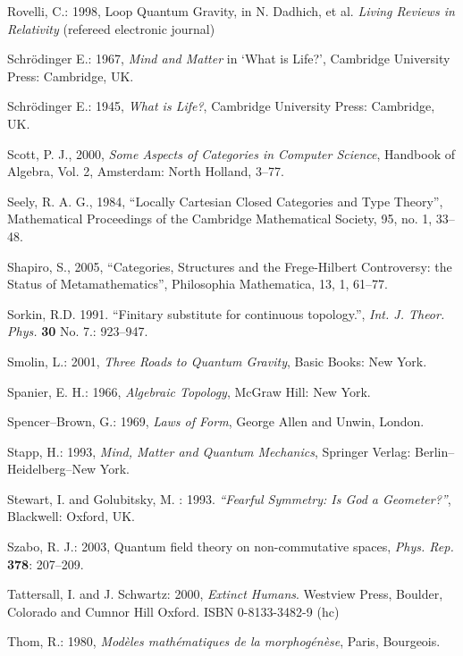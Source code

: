 \documentclass[12pt]{article}
\begin{document}
\begin{thebibliography}{399}
Rovelli, C.: 1998, Loop Quantum Gravity, in N. Dadhich, et al. \emph{Living Reviews in Relativity} (refereed electronic journal) 

Schr\"odinger E.: 1967, \emph{Mind and Matter} in `What is Life?', Cambridge University Press: Cambridge, UK.

Schr\"odinger E.: 1945, \emph{ What is Life?}, Cambridge University Press:
Cambridge, UK.

Scott, P. J., 2000, {\em Some Aspects of Categories in Computer Science}, Handbook of Algebra, Vol. 2, Amsterdam: North Holland, 3--77. 

Seely, R. A. G., 1984, ``Locally Cartesian Closed Categories and Type Theory'', Mathematical Proceedings of the Cambridge Mathematical Society, 95, no. 1, 33--48. 

Shapiro, S., 2005, ``Categories, Structures and the Frege-Hilbert Controversy: the Status of Metamathematics'', Philosophia Mathematica, 13, 1, 61--77.

Sorkin, R.D. 1991. ``Finitary substitute for continuous topology.'',
\emph{Int. J. Theor. Phys.} \textbf{30} No. 7.: 923--947.

Smolin, L.: 2001, \emph{Three Roads to Quantum Gravity}, Basic Books: New York.

Spanier, E. H.: 1966, \emph{Algebraic Topology}, McGraw Hill: New York.

Spencer--Brown, G.: 1969, \emph{Laws of Form}, George Allen and Unwin, London.

Stapp, H.: 1993, \emph{Mind, Matter and Quantum Mechanics},
Springer Verlag: Berlin--Heidelberg--New York.

Stewart, I. and Golubitsky, M. : 1993. \emph{``Fearful Symmetry: Is God a Geometer?''}, Blackwell: Oxford, UK.

Szabo, R. J.: 2003, Quantum field theory on non-commutative spaces,
\emph{Phys. Rep.} \textbf{378}: 207--209.

Tattersall, I. and J. Schwartz: 2000, \emph{Extinct Humans}.
Westview Press, Boulder, Colorado and Cumnor Hill Oxford. ISBN 0-8133-3482-9 (hc)

Thom, R.: 1980, \emph{Mod\`eles math\'ematiques de la morphog\'en\`ese}, Paris, Bourgeois.


\end{thebibliography}
\end{document}
